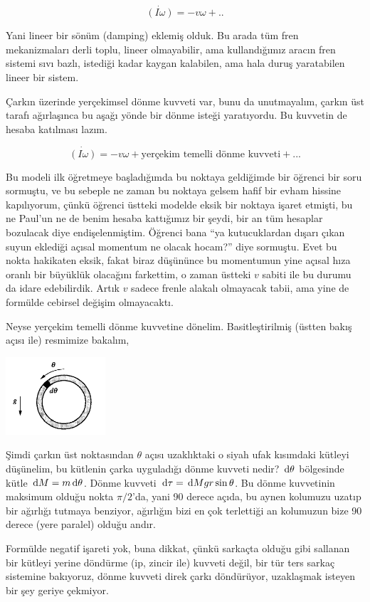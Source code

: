 \documentclass[12pt,fleqn]{article}\usepackage{../../common}
\begin{document}
$$ 
\dot{(I \omega)} = -v \omega + ..
$$

Yani lineer bir sönüm (damping) eklemiş olduk. Bu arada tüm fren
mekanizmaları derli toplu, lineer olmayabilir, ama kullandığımız aracın
fren sistemi sıvı bazlı, istediği kadar kaygan kalabilen, ama hala duruş
yaratabilen lineer bir sistem. 

Çarkın üzerinde yerçekimsel dönme kuvveti var, bunu da unutmayalım, çarkın
üst tarafı ağırlaşınca bu aşağı yönde bir dönme isteği yaratıyordu. Bu
kuvvetin de hesaba katılması lazım. 

$$ 
\dot{(I \omega)} = -v \omega + \textrm{yerçekim temelli dönme kuvveti} + ...
$$

Bu modeli ilk öğretmeye başladığımda bu noktaya geldiğimde bir öğrenci bir
soru sormuştu, ve bu sebeple ne zaman bu noktaya gelsem hafif bir evham
hissine kapılıyorum, çünkü öğrenci üstteki modelde eksik bir noktaya işaret
etmişti, bu ne Paul'un ne de benim hesaba kattığımız bir şeydi, bir an tüm
hesaplar bozulacak diye endişelenmiştim. Öğrenci bana ``ya kutucuklardan
dışarı çıkan suyun eklediği açısal momentum ne olacak hocam?'' diye
sormuştu. Evet bu nokta hakikaten eksik, fakat biraz düşününce bu
momentumun yine açısal hıza oranlı bir büyüklük olacağını farkettim, o
zaman üstteki $v$ sabiti ile bu durumu da idare edebilirdik. Artık $v$
sadece frenle alakalı olmayacak tabii, ama yine de formülde cebirsel
değişim olmayacaktı.

Neyse yerçekim temelli dönme kuvvetine dönelim. Basitleştirilmiş (üstten
bakış açısı ile) resmimize bakalım,

\includegraphics[width=10em]{15_05.png}

Şimdi çarkın üst noktasından $\theta$ açısı uzaklıktaki o siyah ufak
kısımdaki kütleyi düşünelim, bu kütlenin çarka uyguladığı dönme kuvveti
nedir? $\,\mathrm{d}\theta$ bölgesinde kütle $\,\mathrm{d} M = m\,\mathrm{d}\theta$. Dönme kuvveti
$\,\mathrm{d}\tau = \,\mathrm{d} M gr \sin\theta$. Bu dönme kuvvetinin maksimum olduğu nokta
$\pi/2$'da, yani 90 derece açıda, bu aynen kolumuzu uzatıp bir ağırlığı
tutmaya benziyor, ağırlığın bizi en çok terlettiği an kolumuzun bize 90
derece (yere paralel) olduğu andır. 

Formülde negatif işareti yok, buna dikkat, çünkü sarkaçta olduğu gibi
sallanan bir kütleyi yerine döndürme (ip, zincir ile) kuvveti değil, bir
tür ters sarkaç sistemine bakıyoruz, dönme kuvveti direk çarkı döndürüyor,
uzaklaşmak isteyen bir şey geriye çekmiyor.
\end{document}
